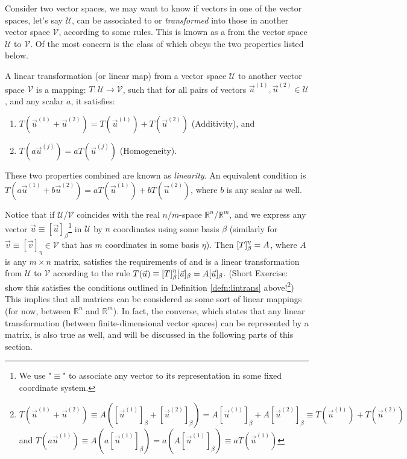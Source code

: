 Consider two vector spaces, we may want to know if vectors in one of the vector spaces, let's say $\mathcal{U}$, can be associated to or \textit{transformed} into those in another vector space $\mathcal{V}$, according to some rules. This is known as a  from the vector space $\mathcal{U}$ to $\mathcal{V}$. Of the most concern is the class of  which obeys the two properties listed below.
\begin{defn}
\label{defn:lintrans}
A linear transformation (or linear map) from a vector space $\mathcal{U}$ to another vector space $\mathcal{V}$ is a mapping: $T: \mathcal{U} \to \mathcal{V}$, such that for all pairs of vectors $\vec{u}^{(1)}, \vec{u}^{(2)} \in \mathcal{U}$, and any scalar $a$, it satisfies:
\begin{enumerate}
    \item $T(\vec{u}^{(1)} + \vec{u}^{(2)}) = T(\vec{u}^{(1)}) + T(\vec{u}^{(2)})$ (Additivity), and
    \item $T(a\vec{u}^{(j)}) = aT(\vec{u}^{(j)})$ (Homogeneity).
\end{enumerate}
These two properties combined are known as \textit{linearity}. An equivalent condition is $T(a\vec{u}^{(1)} + b\vec{u}^{(2)}) = aT(\vec{u}^{(1)}) + bT(\vec{u}^{(2)})$, where $b$ is any scalar as well.
\end{defn}
Notice that if $\mathcal{U}$/$\mathcal{V}$ coincides with the real $n$/$m$-space $\mathbb{R}^n$/$\mathbb{R}^m$, and we express any vector $\vec{u} \equiv [\vec{u}]_\beta$\footnote{We use "$\equiv$" to associate any vector to its representation in some fixed coordinate system.} in $\mathcal{U}$ by $n$ coordinates using some basis $\mathcal{\beta}$ (similarly for $\vec{v} \equiv [\vec{v}]_{\eta} \in \mathcal{V}$ that has $m$ coordinates in some basis $\mathcal{\eta}$). Then $\smash{[T]_\beta^{\eta}} = A$, where $A$ is any $m \times n$ matrix, satisfies the requirements of and is a linear transformation from $\mathcal{U}$ to $\mathcal{V}$ according to the rule $T(\vec{u}) \equiv \smash{[T]_\beta^{\eta}}[\vec{u}]_\beta = A[\vec{u}]_\beta$. (Short Exercise: show this satisfies the conditions outlined in Definition \ref{defn:lintrans} above!\footnote{$T(\vec{u}^{(1)}+\vec{u}^{(2)}) \equiv A([\vec{u}^{(1)}]_\beta + [\vec{u}^{(2)}]_\beta) = A[\vec{u}^{(1)}]_\beta + A[\vec{u}^{(2)}]_\beta \equiv T(\vec{u}^{(1)})+T(\vec{u}^{(2)})$ and $T(a\vec{u}^{(1)}) \equiv A(a[\vec{u}^{(1)}]_\beta) = a(A[\vec{u}^{(1)}]_\beta) \equiv aT(\vec{u}^{(1)})$}) This implies that all matrices can be considered as some sort of linear mappings (for now, between $\mathbb{R}^n$ and $\mathbb{R}^m$). In fact, the converse, which states that any linear transformation (between finite-dimensional vector spaces) can be represented by a matrix, is also true as well, and will be discussed in the following parts of this section. \par
